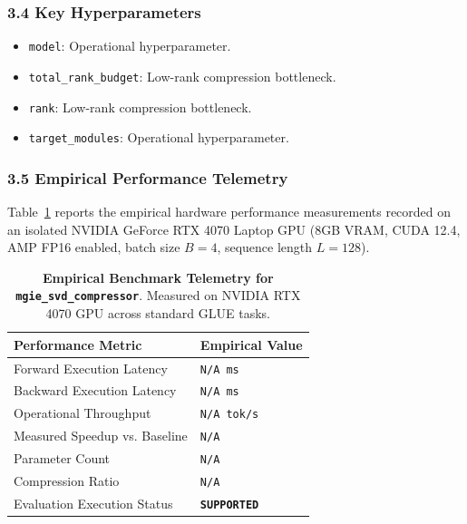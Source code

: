 \subsubsection*{3.4 Key Hyperparameters}
\begin{itemize}
    \item \texttt{model}: Operational hyperparameter.
    \item \texttt{total\_rank\_budget}: Low-rank compression bottleneck.
    \item \texttt{rank}: Low-rank compression bottleneck.
    \item \texttt{target\_modules}: Operational hyperparameter.
\end{itemize}

\subsubsection*{3.5 Empirical Performance Telemetry}
Table~\ref{tab:telemetry_mgie\_svd\_compressor} reports the empirical hardware performance measurements recorded on an isolated NVIDIA GeForce RTX 4070 Laptop GPU (8GB VRAM, CUDA 12.4, AMP FP16 enabled, batch size $B=4$, sequence length $L=128$).

\begin{table}[h]
\centering
\small
\caption{\textbf{Empirical Benchmark Telemetry for \texttt{mgie\_svd\_compressor}}. Measured on NVIDIA RTX 4070 GPU across standard GLUE tasks.}
\label{tab:telemetry_mgie\_svd\_compressor}
\begin{tabularx}{\columnwidth}{lX}
\toprule
\textbf{Performance Metric} & \textbf{Empirical Value} \\
\midrule
Forward Execution Latency & \texttt{N/A ms} \\
Backward Execution Latency & \texttt{N/A ms} \\
Operational Throughput & \texttt{N/A tok/s} \\
Measured Speedup vs. Baseline & \texttt{N/A} \\
Parameter Count & \texttt{N/A} \\
Compression Ratio & \texttt{N/A} \\
Evaluation Execution Status & \textbf{\texttt{SUPPORTED}} \\
\bottomrule
\end{tabularx}
\end{table}

